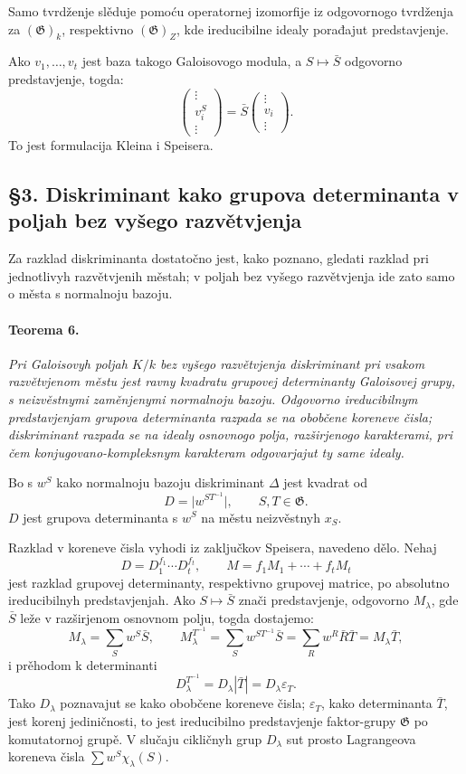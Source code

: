 \documentclass[11pt]{article}
\providecommand{\Gg}{\mathfrak{G}}
\begin{document}
Samo tvrdženje slěduje pomoću operatornej izomorfije iz odgovornogo tvrdženja za \((\Gg)_k\), respektivno \((\Gg)_Z\), kde ireducibilne idealy porađajut predstavjenje.

Ako \(v_1,\ldots,v_t\) jest baza takogo Galoisovogo modula, a \(S\mapsto \bar S\) odgovorno predstavjenje, togda:
\[
        \begin{pmatrix}\vdots\\ v_i^S\\ \vdots\end{pmatrix}
        =\bar S\begin{pmatrix}\vdots\\ v_i\\ \vdots\end{pmatrix}.
\]
To jest formulacija Kleina i Speisera.

\subsection*{§3. Diskriminant kako grupova determinanta v poljah bez vyšego razvětvjenja}

Za razklad diskriminanta dostatočno jest, kako poznano, gledati razklad pri jednotlivyh razvětvjenih městah; v poljah bez vyšego razvětvjenja ide zato samo o města s normalnoju bazoju.

\paragraph{Teorema 6.}
\emph{Pri Galoisovyh poljah \(K/k\) bez vyšego razvětvjenja diskriminant pri vsakom razvětvjenom městu jest ravny kvadratu grupovej determinanty Galoisovej grupy, s neizvěstnymi zaměnjenymi normalnoju bazoju. Odgovorno ireducibilnym predstavjenjam grupova determinanta razpada se na obobčene koreneve čisla; diskriminant razpada se na idealy osnovnogo polja, razširjenogo karakterami, pri čem konjugovano-kompleksnym karakteram odgovarjajut ty same idealy.}

Bo s \(w^S\) kako normalnoju bazoju diskriminant \(\Delta\) jest kvadrat od
\[
        D=\bigl|w^{ST^{-1}}\bigr|,\qquad S,T\in\Gg.
\]
\(D\) jest grupova determinanta s \(w^S\) na městu neizvěstnyh \(x_S\).

Razklad v koreneve čisla vyhodi iz zaključkov Speisera, navedeno dělo. Nehaj
\[
        D=D_1^{f_1}\cdots D_t^{f_t},
        \qquad
        M=f_1M_1+\cdots+f_tM_t
\]
jest razklad grupovej determinanty, respektivno grupovej matrice, po absolutno ireducibilnyh predstavjenjah. Ako \(S\mapsto\bar S\) znači predstavjenje, odgovorno \(M_\lambda\), gde \(\bar S\) leže v razširjenom osnovnom polju, togda dostajemo:
\[
        M_\lambda=\sum_S w^S\bar S,
        \qquad
        M_\lambda^{T^{-1}}=\sum_S w^{ST^{-1}}\bar S
          =\sum_R w^R\bar R\bar T=M_\lambda\bar T,
\]
i prěhodom k determinanti
\[
        D_\lambda^{T^{-1}}=D_\lambda|\bar T|=D_\lambda\varepsilon_T.
\]
Tako \(D_\lambda\) poznavajut se kako obobčene koreneve čisla; \(\varepsilon_T\), kako determinanta \(\bar T\), jest korenj jediničnosti, to jest ireducibilno predstavjenje faktor-grupy \(\Gg\) po komutatornoj grupě. V slučaju cikličnyh grup \(D_\lambda\) sut prosto Lagrangeova koreneva čisla \(\sum w^S\chi_\lambda(S)\).
\end{document}
